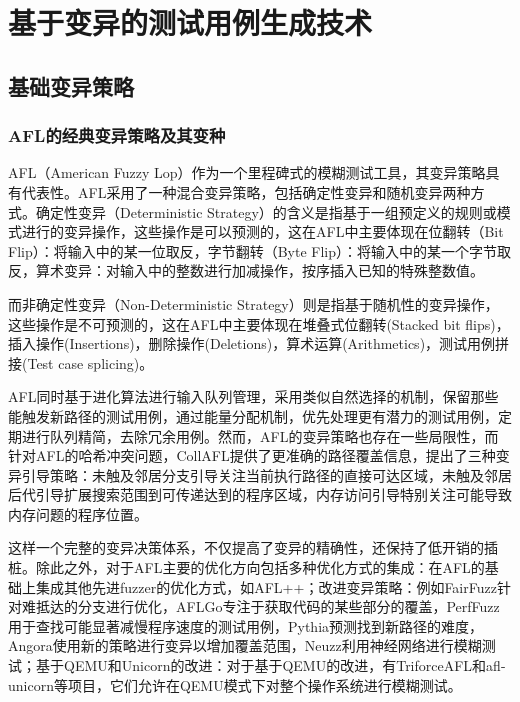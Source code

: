 \documentclass[10.5pt,compsoc]{CjC}
\theoremstyle{mystyle}
\begin{document}
\section{基于变异的测试用例生成技术}

\subsection{基础变异策略}

\subsubsection{AFL的经典变异策略及其变种}

AFL（American Fuzzy Lop）作为一个里程碑式的模糊测试工具，其变异策略具有代表性。AFL采用了一种混合变异策略，包括确定性变异和随机变异两种方式。确定性变异（Deterministic Strategy）的含义是指基于一组预定义的规则或模式进行的变异操作，这些操作是可以预测的，这在AFL中主要体现在位翻转（Bit Flip）：将输入中的某一位取反，字节翻转（Byte Flip）：将输入中的某一个字节取反，算术变异：对输入中的整数进行加减操作，按序插入已知的特殊整数值。

而非确定性变异（Non-Deterministic Strategy）则是指基于随机性的变异操作，这些操作是不可预测的，这在AFL中主要体现在堆叠式位翻转(Stacked bit flips)，插入操作(Insertions)，删除操作(Deletions)，算术运算(Arithmetics)，测试用例拼接(Test case splicing)\cite{Zhang}。

AFL同时基于进化算法进行输入队列管理，采用类似自然选择的机制，保留那些能触发新路径的测试用例，通过能量分配机制，优先处理更有潜力的测试用例，定期进行队列精简，去除冗余用例。然而，AFL的变异策略也存在一些局限性，而针对AFL的哈希冲突问题，CollAFL提供了更准确的路径覆盖信息\cite{Collafl}，提出了三种变异引导策略：未触及邻居分支引导关注当前执行路径的直接可达区域，未触及邻居后代引导扩展搜索范围到可传递达到的程序区域，内存访问引导特别关注可能导致内存问题的程序位置。

这样一个完整的变异决策体系，不仅提高了变异的精确性，还保持了低开销的插桩。除此之外，对于AFL主要的优化方向包括多种优化方式的集成：在AFL的基础上集成其他先进fuzzer的优化方式，如AFL++\cite{Fioraldi}；改进变异策略：例如FairFuzz针对难抵达的分支进行优化，AFLGo专注于获取代码的某些部分的覆盖，PerfFuzz用于查找可能显著减慢程序速度的测试用例，Pythia预测找到新路径的难度，Angora使用新的策略进行变异以增加覆盖范围，Neuzz利用神经网络进行模糊测试；基于QEMU和Unicorn的改进：对于基于QEMU的改进，有TriforceAFL和afl-unicorn等项目，它们允许在QEMU模式下对整个操作系统进行模糊测试\cite{Chang}。

\vspace {10mm}
\end{document}
